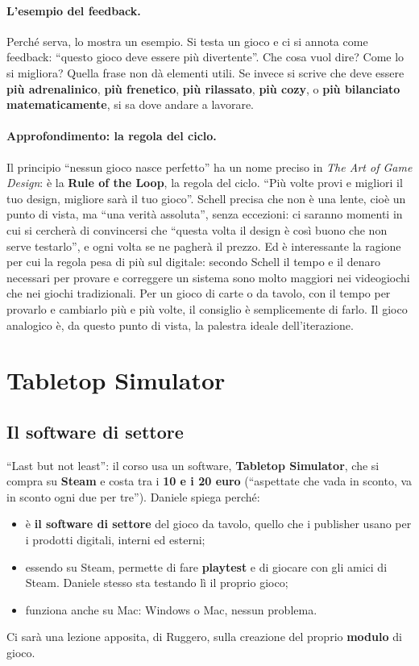 \paragraph{L'esempio del feedback.} Perché serva, lo mostra un esempio. Si
testa un gioco e ci si annota come feedback: ``questo gioco deve essere più
divertente''. Che cosa vuol dire? Come lo si migliora? Quella frase non dà
elementi utili. Se invece si scrive che deve essere \textbf{più adrenalinico},
\textbf{più frenetico}, \textbf{più rilassato}, \textbf{più cozy}, o
\textbf{più bilanciato matematicamente}, si sa dove andare a lavorare.

\paragraph{Approfondimento: la regola del ciclo.} Il principio ``nessun gioco
nasce perfetto'' ha un nome preciso in \emph{The Art of Game Design}: è la
\textbf{Rule of the Loop}, la regola del ciclo. ``Più volte provi e migliori il
tuo design, migliore sarà il tuo gioco''. Schell precisa che non è una lente,
cioè un punto di vista, ma ``una verità assoluta'', senza eccezioni: ci saranno
momenti in cui si cercherà di convincersi che ``questa volta il design è così
buono che non serve testarlo'', e ogni volta se ne pagherà il prezzo. Ed è
interessante la ragione per cui la regola pesa di più sul digitale: secondo
Schell il tempo e il denaro necessari per provare e correggere un sistema sono
molto maggiori nei videogiochi che nei giochi tradizionali. Per un gioco di
carte o da tavolo, con il tempo per provarlo e cambiarlo più e più volte, il
consiglio è semplicemente di farlo. Il gioco analogico è, da questo punto di
vista, la palestra ideale dell'iterazione.

\section{Tabletop Simulator}
\label{a1:sec:tts}

\subsection{Il software di settore}

``Last but not least'': il corso usa un software, \textbf{Tabletop Simulator},
che si compra su \textbf{Steam} e costa tra i \textbf{10 e i 20 euro} (``aspettate
che vada in sconto, va in sconto ogni due per tre''). Daniele spiega perché:
\begin{itemize}
  \item è \textbf{il software di settore} del gioco da tavolo, quello che i
        publisher usano per i prodotti digitali, interni ed esterni;
  \item essendo su Steam, permette di fare \textbf{playtest} e di giocare con gli
        amici di Steam. Daniele stesso sta testando lì il proprio gioco;
  \item funziona anche su Mac: Windows o Mac, nessun problema.
\end{itemize}
Ci sarà una lezione apposita, di Ruggero, sulla creazione del proprio
\textbf{modulo} di gioco.

